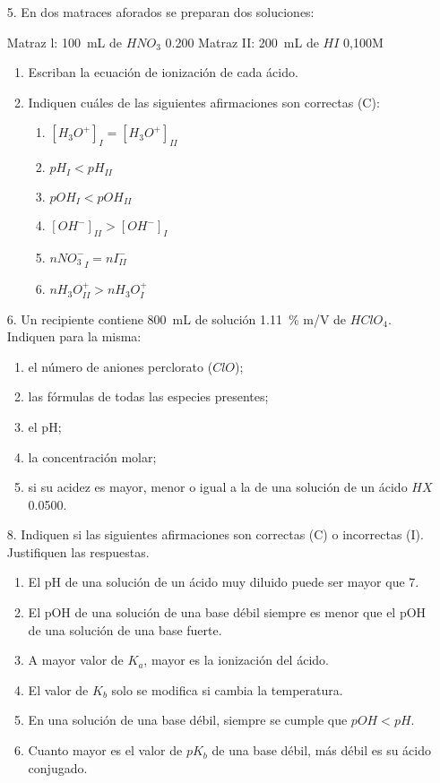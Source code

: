 \documentclass[../practica.root.tex]{subfiles}
\begin{document}
\begin{enumerate}
	\item[5.] En dos matraces aforados se preparan dos soluciones:

	      Matraz l: \SI{100}{\mL} de $HNO_3$ \SI{0,200}{\MR}
	      Matraz II: \SI{200}{\mL} de $HI$ 0,100M
	      \begin{enumerate}
		      \item Escriban la ecuación de ionización de cada ácido.
		      \item Indiquen cuáles de las siguientes afirmaciones son correctas (C):
		            \begin{enumerate}
			            \item $[H_3O^+]_I = [H_3O^+]_{II}$
			            \item $pH_I < pH_{II}$
			            \item $pOH_I < pOH_{II}$
			            \item $[OH^-]_{II} > [OH^-]_I$
			            \item $n {NO_3^-}_I = nI^-_{II}$
			            \item $n H_3O^+_{II} > n H_3O^+_I$
		            \end{enumerate}
	      \end{enumerate}

	\item[6.] Un recipiente contiene \SI{800}{\mL} de solución \SI{1,11}{\percent} m/V de $HClO_4$. Indiquen para la misma:
	      \begin{enumerate}
		      \item el número de aniones perclorato ($ClO$);
		      \item las fórmulas de todas las especies presentes;
		      \item el pH;
		      \item la concentración molar;
		      \item si su acidez es mayor, menor o igual a la de una solución de un ácido $HX$ \SI{0,0500}{\MR}.
	      \end{enumerate}

	\item[8.] Indiquen si las siguientes afirmaciones son correctas (C) o incorrectas (I). Justifiquen las
	      respuestas.
	      \begin{enumerate}
		      \item El pH de una solución de un ácido muy diluido puede ser mayor que 7.
		      \item El pOH de una solución de una base débil siempre es menor que el pOH de una solución de una base fuerte.
		      \item A mayor valor de $K_a$, mayor es la ionización del ácido.
		      \item El valor de $K_b$ solo se modifica si cambia la temperatura.
		      \item En una solución de una base débil, siempre se cumple que $pOH < pH$.
		      \item Cuanto mayor es el valor de $pK_b$ de una base débil, más débil es su ácido conjugado.
	      \end{enumerate}


\end{enumerate}
\end{document}
